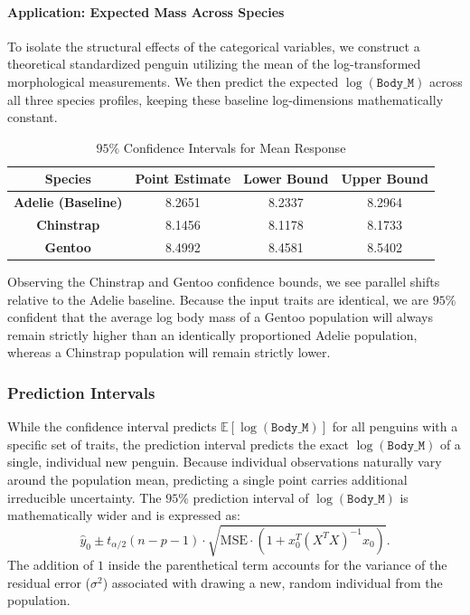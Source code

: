 \documentclass[12pt]{article}
\begin{document}
  \paragraph{Application: Expected Mass Across Species}
  To isolate the structural effects of the categorical
  variables, we construct a theoretical standardized penguin
  utilizing the mean of the log-transformed morphological
  measurements. We then predict the expected $\log(\texttt{Body\_M})$
  across all three species profiles, keeping these baseline
  log-dimensions mathematically constant.

  \begin{table}[H]
    \centering
    \begin{tabular}{|| c | c | c c ||}
      \hline
      \textbf{Species}
      & \textbf{Point Estimate}
      & \textbf{Lower Bound}
      & \textbf{Upper Bound} \\
      \hline\hline
      \textbf{Adelie (Baseline)} & 8.2651 & 8.2337 & 8.2964 \\
      \textbf{Chinstrap} & 8.1456 & 8.1178 & 8.1733 \\
      \textbf{Gentoo} & 8.4992 & 8.4581 & 8.5402 \\
      \hline
    \end{tabular}
    \caption{$95\%$ Confidence Intervals for Mean Response}
  \end{table}

  Observing the Chinstrap and Gentoo confidence bounds,
  we see parallel shifts relative to the Adelie baseline.
  Because the input traits are identical, we are $95\%$
  confident that the average log body mass of a Gentoo
  population will always remain strictly higher than an
  identically proportioned Adelie population, whereas a
  Chinstrap population will remain strictly lower.


  \subsubsection{Prediction Intervals}
  While the confidence interval predicts
  $\mathbb{E}[\log(\texttt{Body\_M})]$
  for all penguins with a specific set of traits, the
  prediction interval predicts the exact
  $\log(\texttt{Body\_M})$
  of a
  single, individual new penguin. Because individual
  observations naturally vary around the population mean,
  predicting a single point carries additional irreducible
  uncertainty. The $95\%$ prediction interval
  of $\log(\texttt{Body\_M})$ is mathematically
  wider and is expressed as:
  \[
    \hat{y}_0 \pm t_{\alpha/2}(n-p-1) \cdot
    \sqrt{\text{MSE} \cdot \left(1 + x_0^T
    (X^T X)^{-1} x_0\right)}
    .\]
  The addition of $1$ inside the parenthetical term accounts
  for the variance of the residual error ($\sigma^2$)
  associated with drawing a new, random individual from the
  population.
\end{document}
